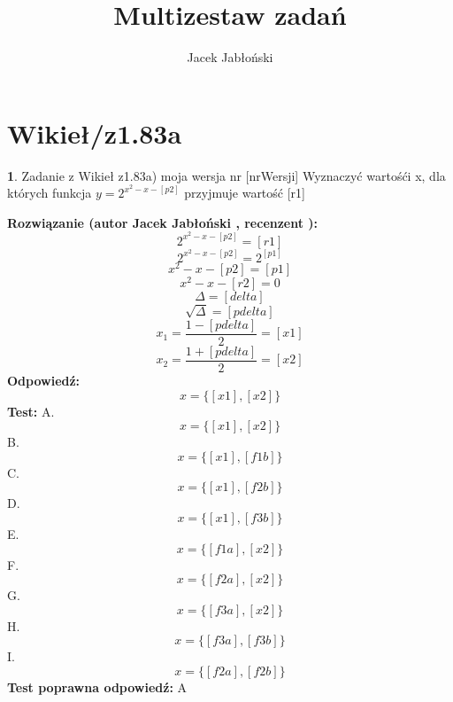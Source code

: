 \documentclass[12pt, a4paper]{article}
\title{Multizestaw zadań}
\author{Jacek Jabłoński}
\date{}
\theoremstyle{definition} %
\newtheorem{zad}{}
\newcommand{\kategoria}[1]{\section{#1}} %
\newcommand{\zadStart}[1]{\begin{zad}#1\newline} %
\newcommand{\zadStop}{\end{zad}}   %
\newcommand{\rozwStart}[2]{\noindent \textbf{Rozwiązanie (autor #1 , recenzent #2): }\newline} %
\newcommand{\rozwStop}{\newline}                                            %
\newcommand{\odpStart}{\noindent \textbf{Odpowiedź:}\newline}    %
\newcommand{\odpStop}{\newline}                                             %
\newcommand{\testStart}{\noindent \textbf{Test:}\newline} %
\newcommand{\testStop}{\newline} %
\newcommand{\kluczStart}{\noindent \textbf{Test poprawna odpowiedź:}\newline} %
\newcommand{\kluczStop}{\newline} %
\begin{document}
\maketitle


\kategoria{Wikieł/z1.83a}
\zadStart{Zadanie z Wikieł z1.83a) moja wersja nr [nrWersji]}
Wyznaczyć wartośći x, dla których funkcja $y=2^{x^2-x-[p2]}$ przyjmuje wartość [r1]
\zadStop
\rozwStart{Jacek Jabłoński}{}
$$2^{x^2-x-[p2]} = [r1] $$
$$2^{x^2-x-[p2]} = 2^{[p1]}$$
$$x^2-x-[p2] = [p1]$$
$$x^2-x-[r2] = 0$$
$$\Delta = [delta]$$
$$\sqrt{\Delta} = [pdelta]$$
$$x_1 = \frac{1 - [pdelta]}{2} = [x1]$$
$$x_2 = \frac{1 + [pdelta]}{2} = [x2]$$
\rozwStop
\odpStart
$$x=\{[x1],[x2]\}$$
\odpStop
\testStart
A. $$x=\{[x1],[x2]\}$$
B. $$x=\{[x1],[f1b]\}$$
C. $$x=\{[x1],[f2b]\}$$
D. $$x=\{[x1],[f3b]\}$$
E. $$x=\{[f1a],[x2]\}$$
F. $$x=\{[f2a],[x2]\}$$
G. $$x=\{[f3a],[x2]\}$$
H. $$x=\{[f3a],[f3b]\}$$
I. $$x=\{[f2a],[f2b]\}$$
\testStop
\kluczStart
A
\kluczStop
\end{document}
